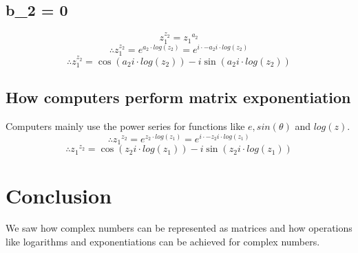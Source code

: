\documentclass[12pt]{article}
\begin{document}
    \subsection{b_2 = 0}
    $$ z_{1}^{z_{2}} = {z_1}^{a_2}$$
    $$ \therefore z_{1}^{z_{2}} = e^{a_{2}\cdot log(z_2)} = e^{i \cdot -a_{2}i\cdot log(z_2)}$$
    $$ \therefore z_{1}^{z_{2}} = \cos(a_{2}i\cdot log(z_2)) - i\sin(a_{2}i\cdot log(z_2))$$
    \subsection{How computers perform matrix exponentiation}
    Computers mainly use the power series for functions like $e,sin(\theta)$ and $log(z)$.
    $$ \therefore {z_1}^{z_2} = e^{z_2 \cdot log(z_1)} = e^{i \cdot -z_{2}i \cdot log(z_1)}$$
    $$ \therefore {z_1}^{z_2} = \cos(z_{2}i \cdot log(z_1)) - i\sin(z_{2}i \cdot log(z_1))$$

    \section{Conclusion}
    We saw how complex numbers can be represented as matrices and how operations like logarithms and exponentiations can be achieved for complex numbers.
    
    
    
    
    
\end{document}
